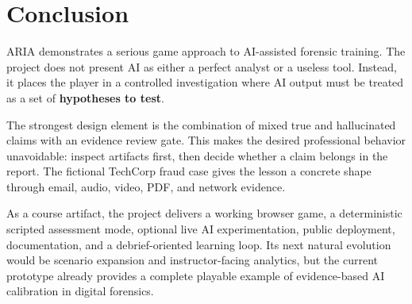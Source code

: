 \chapter{Conclusion}

ARIA demonstrates a serious game approach to AI-assisted forensic training. The project does not present AI as either a perfect analyst or a useless tool. Instead, it places the player in a controlled investigation where AI output must be treated as a set of \textbf{hypotheses to test}.

The strongest design element is the combination of mixed true and hallucinated claims with an evidence review gate. This makes the desired professional behavior unavoidable: inspect artifacts first, then decide whether a claim belongs in the report. The fictional TechCorp fraud case gives the lesson a concrete shape through email, audio, video, PDF, and network evidence.

As a course artifact, the project delivers a working browser game, a deterministic scripted assessment mode, optional live AI experimentation, public deployment, documentation, and a debrief-oriented learning loop. Its next natural evolution would be scenario expansion and instructor-facing analytics, but the current prototype already provides a complete playable example of evidence-based AI calibration in digital forensics.
